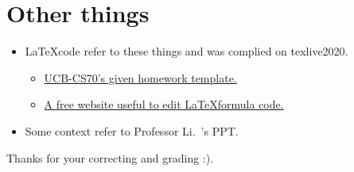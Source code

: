 \documentclass[11pt]{article}  %
\begin{document}
\section*{Other things}

\begin{itemize}
    \item \LaTeX \space code refer to these things and was complied on texlive2020. 
    \begin{itemize}
        \item  \href{https://www.eecs70.org/assets/misc/homework_template.tex}{UCB-CS70's given homework template.} 
        \item  \href{https://www.latexlive.com}{A free website useful to edit \LaTeX \space formula code.}
    \end{itemize}
    \item Some context refer to Professor Li.~'s PPT.
\end{itemize}

    Thanks for your correcting and grading :).
\end{document}

